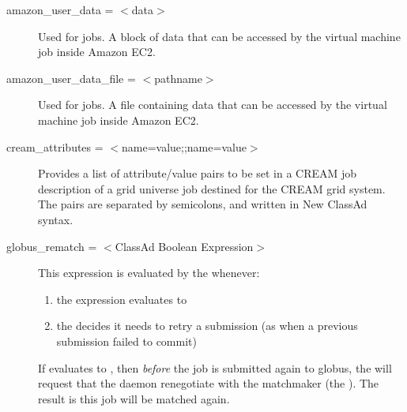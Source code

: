 \begin{description}

\item[amazon\_user\_data = $<$data$>$]
Used for  jobs. A block of data that can be accessed
by the virtual machine job inside Amazon EC2.


\item[amazon\_user\_data\_file = $<$pathname$>$]
Used for  jobs.
A file containing data that can be accessed
by the virtual machine job inside Amazon EC2.


\item[cream\_attributes = $<$name=value;\Dots;name=value$>$]
Provides a list of attribute/value pairs to be set in a CREAM job description
of a grid universe job destined for the CREAM grid system.
The pairs are separated by semicolons, and written in New ClassAd syntax.



\label{condor-submit-globus-rematch}
\item[globus\_rematch = $<$ClassAd Boolean Expression$>$]
This expression is evaluated by the  whenever:
\begin{enumerate}
\item
   the  expression evaluates to 
\item
   the  decides it needs to retry a submission
   (as when a previous submission failed to commit)
\end{enumerate}
If  evaluates to ,
then \emph{before} the job is submitted again to globus,
the  will request that the 
daemon renegotiate
with the matchmaker (the ).
The result is this job will be matched again.



\end{description}
